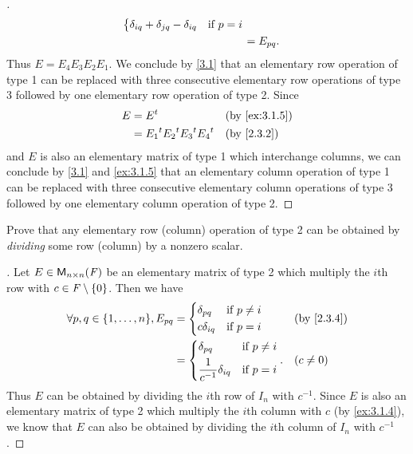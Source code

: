 \begin{proof}[]
\begin{align*}
\begin{dcases}
			     \delta_{i q} + \delta_{j q} - \delta_{i q} & \text{if } p = i
		     \end{dcases}                                                           \\
		 & = E_{p q}.
	\end{align*}
	Thus \(E = E_4 E_3 E_2 E_1\).
	We conclude by \cref{3.1} that an elementary row operation of type 1 can be replaced with three consecutive elementary row operations of type 3 followed by one elementary row operation of type 2.
	Since
	\begin{align*}
		E & = \tp{E}                              &  & \by{ex:3.1.5} \\
		  & = \tp{E_1} \tp{E_2} \tp{E_3} \tp{E_4} &  & \by{2.3.2}
	\end{align*}
	and \(E\) is also an elementary matrix of type 1 which interchange columns, we can conclude by \cref{3.1} and \cref{ex:3.1.5} that an elementary column operation of type 1 can be replaced with three consecutive elementary column operations of type 3 followed by one elementary column operation of type 2.
\end{proof}

\begin{ex}\label{ex:3.1.10}
	Prove that any elementary row (column) operation of type 2 can be obtained by \emph{dividing} some row (column) by a nonzero scalar.
\end{ex}

\begin{proof}[]
	Let \(E \in \ms[n][n][\F]\) be an elementary matrix of type 2 which multiply the \(i\)th row with \(c \in \mathit{F} \setminus \left\lbrace0\right\rbrace\).
	Then we have
	\begin{align*}
		\forall p, q \in \set{1, \dots, n}, E_{p q} & = \begin{dcases}
			                                                \delta_{p q}   & \text{if } p \neq i \\
			                                                c \delta_{i q} & \text{if } p = i
		                                                \end{dcases}                                      &  & \by{2.3.4}           \\
		                                            & = \begin{dcases}
			                                                \delta_{p q}                  & \text{if } p \neq i \\
			                                                \frac{1}{c^{-1}} \delta_{i q} & \text{if } p = i
		                                                \end{dcases}. &  & (c \neq 0)
	\end{align*}
	Thus \(E\) can be obtained by dividing the \(i\)th row of \(I_n\) with \(c^{-1}\).
	Since \(E\) is also an elementary matrix of type 2 which multiply the \(i\)th column with \(c\) (by \cref{ex:3.1.4}), we know that \(E\) can also be obtained by dividing the \(i\)th column of \(I_n\) with \(c^{-1}\).
\end{proof}


